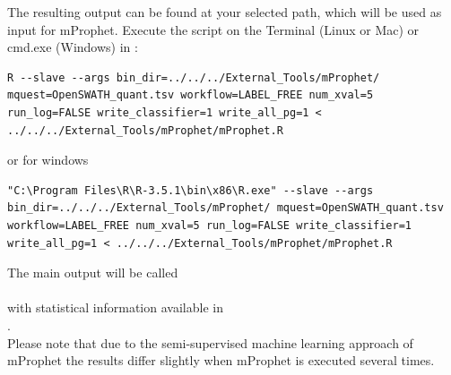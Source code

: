 \noindent The resulting output can be found at your selected path, which will be used as input for mProphet. Execute the script on the Terminal (Linux or Mac) or cmd.exe (Windows) in :

\begin{lstlisting}
R --slave --args bin_dir=../../../External_Tools/mProphet/ mquest=OpenSWATH_quant.tsv workflow=LABEL_FREE num_xval=5 run_log=FALSE write_classifier=1 write_all_pg=1 < ../../../External_Tools/mProphet/mProphet.R
\end{lstlisting}
or for windows
\begin{lstlisting}
"C:\Program Files\R\R-3.5.1\bin\x86\R.exe" --slave --args bin_dir=../../../External_Tools/mProphet/ mquest=OpenSWATH_quant.tsv workflow=LABEL_FREE num_xval=5 run_log=FALSE write_classifier=1 write_all_pg=1 < ../../../External_Tools/mProphet/mProphet.R
\end{lstlisting}

\newline

\noindent The main output will be called\\
\\
with statistical information available in\\
.\\

\noindent Please note that due to the semi-supervised machine learning approach of mProphet the results differ slightly when mProphet is executed several times. \\

